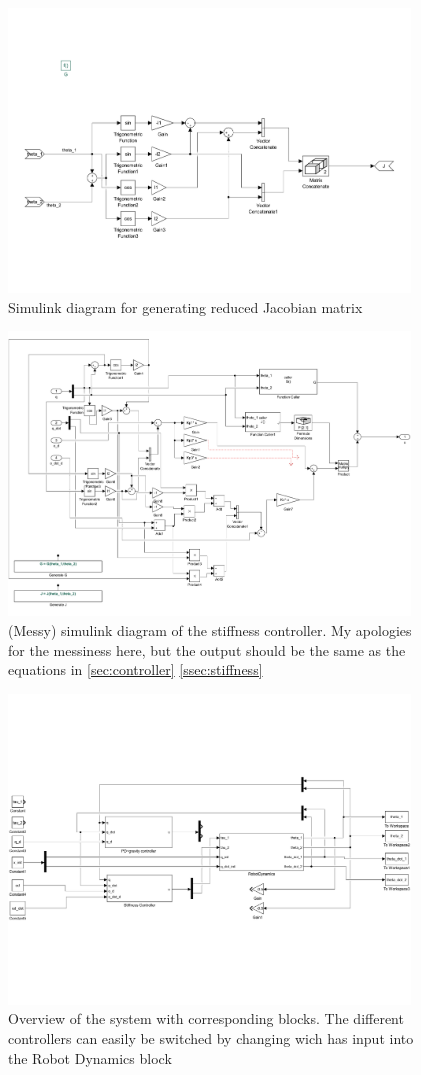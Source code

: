 \documentclass[a4paper]{scrartcl}
\begin{document}
\begin{figure}[ht]
	\centering
	\includegraphics[width=0.95\textwidth]{fig/J_func.pdf}
	\caption{Simulink diagram for generating reduced Jacobian matrix}
	\label{fig:genJ}
\end{figure}
\begin{figure}[ht]
	\centering
	\includegraphics[width=0.95\textwidth]{fig/stiffness.pdf}
	\caption{(Messy) simulink diagram of the stiffness controller. My apologies for the messiness here, but the output should be the same as the equations in \autoref{sec:controller} \autoref{ssec:stiffness}}
	\label{fig:stiffness}
\end{figure}
\begin{figure}[ht]
	\centering
	\includegraphics[width=0.95\textwidth]{fig/full_system.pdf}
	\caption{Overview of the system with corresponding blocks. The different controllers can easily be switched by changing wich has input into the Robot Dynamics block}
	\label{fig:system}
\end{figure}
\end{document}
